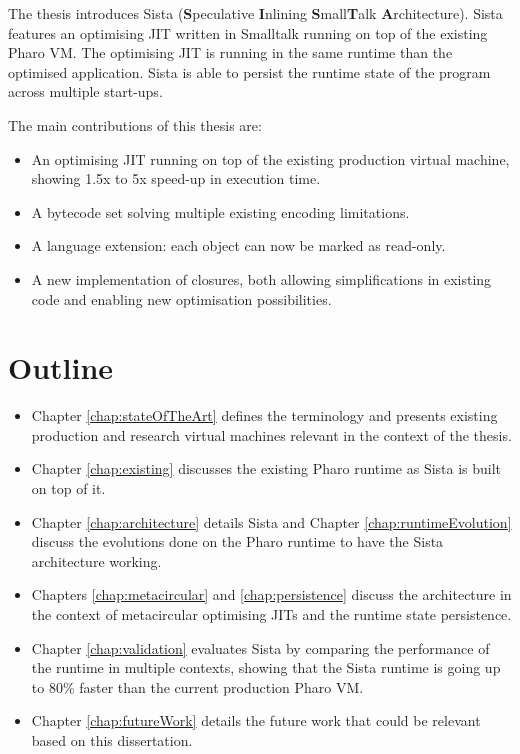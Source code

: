 \documentclass[a4paper,12pt,twoside]{../includes/ThesisStyle}
\begin{document}
The thesis introduces Sista (\textbf{S}peculative \textbf{I}nlining \textbf{S}mall\textbf{T}alk \textbf{A}rchitecture). Sista features an optimising JIT written in Smalltalk running on top of the existing Pharo VM. The optimising JIT is running in the same runtime than the optimised application. Sista is able to persist the runtime state of the program across multiple start-ups. %

The main contributions of this thesis are:
\begin{itemize}
	\item An optimising JIT running on top of the existing production virtual machine, showing 1.5x to 5x speed-up in execution time.
	\item A bytecode set solving multiple existing encoding limitations.
	\item A language extension: each object can now be marked as read-only.
	\item A new implementation of closures, both allowing simplifications in existing code and enabling new optimisation possibilities.
\end{itemize}

\section{Outline}

\begin{itemize}
	\item Chapter \ref{chap:stateOfTheArt} defines the terminology and presents existing production and research virtual machines relevant in the context of the thesis. 
	\item Chapter \ref{chap:existing} discusses the existing Pharo runtime as Sista is built on top of it.
	\item Chapter \ref{chap:architecture} details Sista and Chapter \ref{chap:runtimeEvolution} discuss the evolutions done on the Pharo runtime to have the Sista architecture working.
	\item Chapters \ref{chap:metacircular} and \ref{chap:persistence} discuss the architecture in the context of metacircular optimising JITs and the runtime state persistence. 
	\item Chapter \ref{chap:validation} evaluates Sista by comparing the performance of the runtime in multiple contexts, showing that the Sista runtime is going up to 80\% faster than the current production Pharo VM.
	\item Chapter \ref{chap:futureWork} details the future work that could be relevant based on this dissertation.
\end{itemize}
\end{document}
